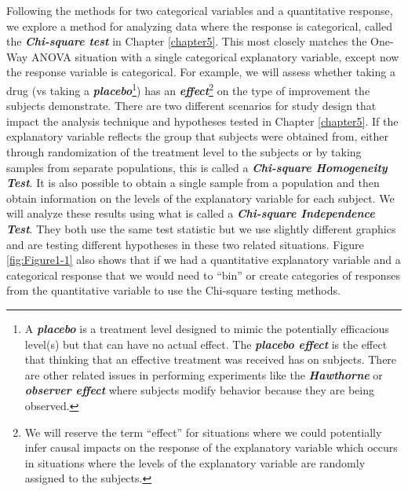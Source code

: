 \documentclass[]{book}
\let\rmarkdownfootnote\footnote%
\def\footnote{\protect\rmarkdownfootnote}
\renewcommand{\indent}{\hspace{15pt}}
\begin{document}
\indent Following the methods for two categorical variables and a quantitative response, we explore a method for
analyzing data where the response is categorical, called the \textbf{\emph{Chi-square test}}
in Chapter \ref{chapter5}. This most closely matches the One-Way ANOVA
situation with a single categorical explanatory variable, except now the
response variable is categorical. For example, we will assess whether taking a
drug (vs taking a \textbf{\emph{placebo}}\footnote{A \textbf{\emph{placebo}} is a treatment level designed to
  mimic the potentially efficacious level(s) but that can have no actual effect. The
  \textbf{\emph{placebo effect}} is the effect that thinking that an effective treatment was
  received has on subjects. There are other related issues in performing experiments
  like the \textbf{\emph{Hawthorne}} or \textbf{\emph{observer effect}} where subjects modify behavior
  because they are being observed.})
has an \textbf{\emph{effect}}\footnote{We will reserve the term ``effect'' for situations where we could
  potentially infer causal impacts on the response of the explanatory variable which
  occurs in situations where the levels of the explanatory variable are randomly
  assigned to the subjects.} on the type of improvement the subjects demonstrate. There
are two different scenarios
for study design that impact the analysis technique and hypotheses tested in
Chapter \ref{chapter5}. If the explanatory variable reflects the group that
subjects were
obtained from, either through randomization of the treatment level to the
subjects or by taking samples from separate populations, this is called a
\textbf{\emph{Chi-square Homogeneity Test}}.  It is also possible to obtain a single sample
from a population and then obtain information on the levels of the explanatory
variable for each
subject. We will analyze these results using what is called a \textbf{\emph{Chi-square Independence Test}}.
 They both use the same test statistic but we use slightly different graphics and are testing different hypotheses in these two related
situations. Figure \ref{fig:Figure1-1} also shows that if we had a quantitative explanatory
variable and a categorical response that we would need to ``bin'' or create
categories of responses from the quantitative variable to use the Chi-square
testing methods.
\end{document}
